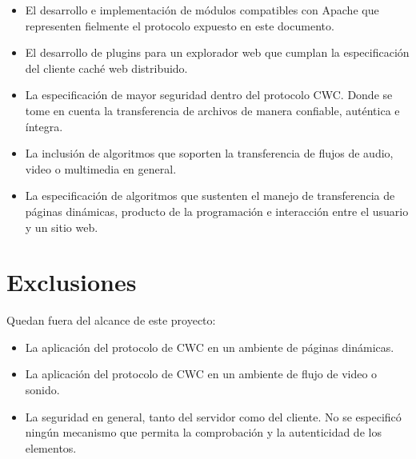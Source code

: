 \begin{itemize}
\item El desarrollo e implementación de módulos compatibles con Apache que representen fielmente el protocolo expuesto en este documento. 

\item El desarrollo de plugins para un explorador web que cumplan la especificación del cliente caché web distribuido.

\item La especificación de mayor seguridad dentro del protocolo CWC. Donde se tome en cuenta la transferencia de archivos de manera confiable, auténtica e íntegra. 

\item La inclusión de algoritmos que soporten la transferencia de flujos de audio, video o multimedia en general.

\item La especificación de algoritmos que sustenten el manejo de transferencia de páginas dinámicas, producto de la programación e interacción entre el usuario y un sitio web. 		

\end{itemize}


\section{Exclusiones}
Quedan fuera del alcance de este proyecto:

\begin{itemize}
\item La aplicación del protocolo de CWC en un ambiente de páginas dinámicas.
\item La aplicación del protocolo de CWC en un ambiente de flujo de video o sonido.
\item La seguridad en general, tanto del servidor como del cliente. No se especificó ningún mecanismo que permita la comprobación y la autenticidad de los elementos.
\end{itemize}

